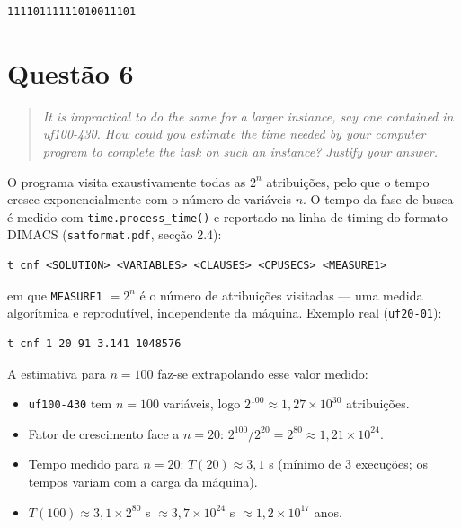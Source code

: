 \documentclass[11pt,a4paper]{article}
\begin{document}
\begin{lstlisting}
11110111111010011101
\end{lstlisting}

\section{Questão 6}

\begin{quote}\itshape
It is impractical to do the same for a larger instance, say one contained in uf100-430.
How could you estimate the time needed by your computer program to complete the task on
such an instance? Justify your answer.
\end{quote}

O programa visita exaustivamente todas as $2^n$ atribuições, pelo que o tempo cresce
exponencialmente com o número de variáveis $n$. O tempo da fase de busca é medido com
\texttt{time.process\_time()} e reportado na linha de timing do formato DIMACS
(\texttt{satformat.pdf}, secção 2.4):

\begin{lstlisting}
t cnf <SOLUTION> <VARIABLES> <CLAUSES> <CPUSECS> <MEASURE1>
\end{lstlisting}

em que \texttt{MEASURE1} $= 2^n$ é o número de atribuições visitadas --- uma medida
algorítmica e reprodutível, independente da máquina. Exemplo real (\texttt{uf20-01}):

\begin{lstlisting}
t cnf 1 20 91 3.141 1048576
\end{lstlisting}

A estimativa para $n = 100$ faz-se extrapolando esse valor medido:

\begin{itemize}[leftmargin=1.4em,itemsep=2pt]
  \item \texttt{uf100-430} tem $n = 100$ variáveis, logo
        $2^{100} \approx 1{,}27 \times 10^{30}$ atribuições.
  \item Fator de crescimento face a $n = 20$:
        $2^{100}/2^{20} = 2^{80} \approx 1{,}21 \times 10^{24}$.
  \item Tempo medido para $n = 20$: $T(20) \approx 3{,}1$ s
        (mínimo de 3 execuções; os tempos variam com a carga da máquina).
  \item $T(100) \approx 3{,}1 \times 2^{80}$ s
        $\approx 3{,}7 \times 10^{24}$ s
        $\approx 1{,}2 \times 10^{17}$ anos.
\end{itemize}
\end{document}
